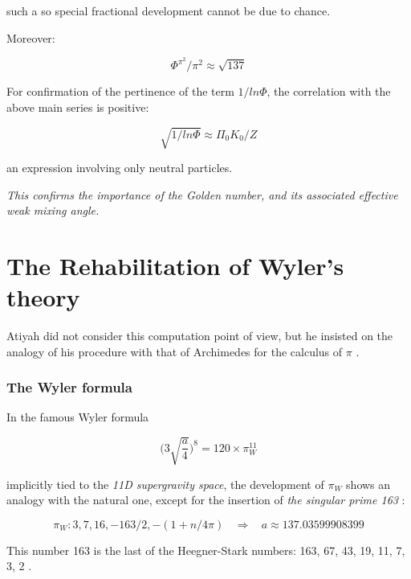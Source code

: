 \documentclass[a4paper,9pt]{article}
\begin{document}
such a so special fractional development cannot be due to chance. 


Moreover:

\begin{equation}
\Phi^{\pi^2}/\pi^2 \approx \sqrt{137}
\end{equation}

For confirmation of the pertinence of the term $1/ln\Phi$, the correlation with the above main series is positive:

\begin{equation}
\sqrt{1/ln\Phi} \approx \Pi_0 K_0/Z
\end{equation}

an expression involving only neutral particles.



\textit{This confirms the importance of the Golden number, and its associated effective weak mixing angle.}






\section{The Rehabilitation of Wyler's theory}

Atiyah did not consider this computation point of view, but he insisted on the analogy of his procedure with that of Archimedes for the calculus of $\pi$ \cite{Atiyah}.

\subsubsection {The Wyler formula}

In the famous Wyler formula \cite{Wyler} \cite{oeis1}

\begin{equation}
\bigg(3\sqrt{\frac{a}{4}} \bigg)^8 = 120 \times \pi_W^{11}
\end{equation}


implicitly tied to the \emph{11D supergravity space}, the development of  $\pi_W$ shows an analogy with the natural one, except for the insertion of \textit {the singular prime 163} :

\begin{equation}
\pi_W : 3, 7, 16,- 163/2, -(1+n/4\pi) ~~~~\Rightarrow ~~~~    a \approx 137.03599908399
\end{equation}


This number 163 is the last of the Heegner-Stark numbers: 163, 67, 43, 19, 11, 7, 3, 2 \cite{Stark}. 
\end{document}
